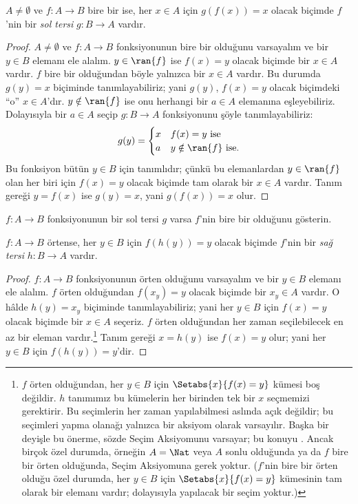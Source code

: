 \documentclass[../../../include/open-logic-section]{subfiles}
\begin{document}
\begin{prop}
$A\neq\emptyset$ ve $f\colon A \to B$ bire bir ise, her $x \in A$ için
$g(f(x))=x$ olacak biçimde $f$'nin bir \emph{sol tersi}
$g\colon B \to A$ vardır.
\end{prop}

\begin{proof}
$A\neq\emptyset$ ve $f\colon A \to B$ fonksiyonunun bire bir olduğunu
varsayalım ve bir
$y \in B$ elemanı ele alalım. $y \in \ran{f}$ ise $f(x)=y$ olacak biçimde bir
$x \in A$ vardır. $f$ bire bir olduğundan böyle yalnızca bir $x \in A$ vardır.
Bu durumda $g(y)=x$ biçiminde tanımlayabiliriz; yani $g(y)$, $f(x)=y$ olacak
biçimdeki ``o'' $x \in A$'dır. $y \notin \ran{f}$ ise onu herhangi bir
$a \in A$ elemanına eşleyebiliriz. Dolayısıyla bir $a \in A$ seçip
$g\colon B \to A$ fonksiyonunu şöyle tanımlayabiliriz:
\[
g(y) = \begin{cases}
    x & \text{$f(x) = y$ ise}\\
    a & \text{$y \notin \ran{f}$ ise.}
\end{cases}
\]
Bu fonksiyon bütün $y \in B$ için tanımlıdır; çünkü bu elemanlardan
$y \in \ran{f}$ olan her biri için $f(x)=y$ olacak biçimde tam olarak bir
$x \in A$ vardır. Tanım gereği $y=f(x)$ ise $g(y)=x$, yani $g(f(x))=x$ olur.
\end{proof}

\begin{prob}
$f\colon A \to B$ fonksiyonunun bir sol tersi $g$ varsa $f$'nin bire bir
olduğunu gösterin.
\end{prob}

\begin{prop}
    $f\colon A \to B$ örtense, her $y \in B$ için $f(h(y))=y$ olacak biçimde
    $f$'nin bir \emph{sağ tersi} $h\colon B \to A$ vardır.
\end{prop}

\begin{proof}
$f\colon A \to B$ fonksiyonunun örten olduğunu varsayalım ve bir $y \in B$
elemanı ele alalım. $f$ örten olduğundan $f(x_y)=y$ olacak biçimde bir
$x_y \in A$ vardır. O hâlde $h(y)=x_y$ biçiminde tanımlayabiliriz; yani her
$y \in B$ için $f(x)=y$ olacak biçimde bir $x \in A$ seçeriz. $f$ örten
olduğundan her zaman seçilebilecek en az bir eleman vardır.\footnote{$f$ örten
olduğundan, her $y \in B$ için $\Setabs{x}{f(x) = y}$ kümesi boş değildir.
$h$ tanımımız bu kümelerin her birinden tek bir $x$ seçmemizi gerektirir. Bu
seçimlerin her zaman yapılabilmesi aslında açık değildir; bu seçimleri yapma
olanağı yalnızca bir aksiyom olarak varsayılır. Başka bir deyişle bu önerme,
sözde Seçim Aksiyomunu varsayar; bu konuyu
. Ancak birçok özel durumda,
örneğin $A=\Nat$ veya $A$ sonlu olduğunda ya da $f$ bire bir örten olduğunda,
Seçim Aksiyomuna gerek yoktur. ($f$'nin bire bir örten olduğu özel durumda,
her $y \in B$ için $\Setabs{x}{f(x) = y}$ kümesinin tam olarak bir elemanı
vardır; dolayısıyla yapılacak bir seçim yoktur.)}
Tanım gereği $x=h(y)$ ise $f(x)=y$ olur; yani her $y \in B$ için
$f(h(y))=y$'dir.
\end{proof}
\end{document}
